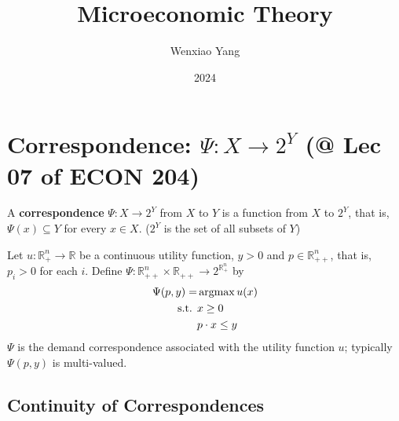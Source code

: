 \documentclass[11pt]{elegantbook}
\title{\textbf{Microeconomic Theory}}
\author{Wenxiao Yang}
\institute{Haas School of Business, University of California Berkeley}
\date{2024}
\newcommand{\argmax}{\operatornamewithlimits{argmax}}
\begin{document}
\maketitle
\frontmatter
\tableofcontents
\mainmatter




\chapter{Correspondence: $\Psi : X \rightarrow 2^Y$ \small{(@ Lec 07 of ECON 204)}}
\begin{definition}[Correspondence]
    \normalfont
    A \textbf{correspondence} $\Psi : X \rightarrow 2^Y$ from $X$ to $Y$ is a function from $X$ to $2^Y$, that is, $\Psi(x) \subseteq Y$ for every $x \in X$. ($2^Y$ is the set of all subsets of $Y$)
\end{definition}
\begin{example}
Let $u : \mathbb{R}_+^n \rightarrow \mathbb{R}$ be a continuous utility function, $y > 0$ and $p \in \mathbb{R}_{++}^n$, that is, $p_i > 0$ for each $i$. Define $\Psi : \mathbb{R}_{++}^n \times \mathbb{R}_{++} \rightarrow 2^{\mathbb{R}_{+}^n}$ by
\begin{equation}
    \begin{aligned}
        \Psi(p,y)=&\argmax u(x)\\
        \textnormal{s.t. }&x\geq 0\\
        &p\cdot x\leq y
    \end{aligned}
    \nonumber
\end{equation}
$\Psi$ is the demand correspondence associated with the utility function $u$; typically $\Psi(p, y)$ is multi-valued.
\end{example}

\section{Continuity of Correspondences}
\end{document}
